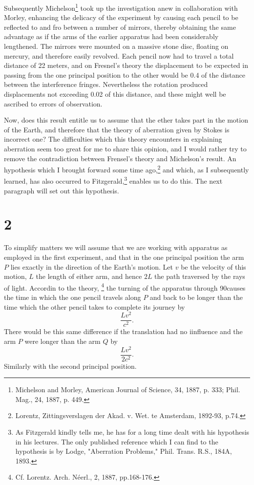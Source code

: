 Subsequently Michelson\footnote{Michelson and Morley, American Journal of Science, 34, 1887, p. 333; Phil. Mag., 24, 1887, p. 449.} took up the investigation anew in collaboration with Morley, enhancing the delicacy of the experiment by causing each pencil to be reflected to and fro between a number of mirrors, thereby obtaining the same advantage as if the arms of the earlier apparatus had been considerably lengthened. The mirrors were mounted on a massive stone disc, floating on mercury, and therefore easily revolved. Each pencil now had to travel a total distance of 22 meters, and on Fresnel's theory the displacement to be expected in passing from the one principal position to the other would be 0.4 of the distance between the interference fringes. Nevertheless the rotation produced displacements not exceeding 0.02 of this distance, and these might well be ascribed to errors of observation.

Now, does this result entitle us to assume that the ether takes part in the motion of the Earth, and therefore that the theory of aberration given by Stokes is incorrect one? The difficulties which this theory encounters in explaining aberration seem too great for me to share this opinion, and I would rather try to remove the contradiction between Frensel's theory and Michelson's result. An hypothesis which I brought forward some time ago,\footnote{Lorentz, Zittingsverslagen der Akad. v. Wet. te Amsterdam, 1892-93, p.74.} and which, as I subsequently learned, has also occurred to Fitzgerald,\footnote{As Fitzgerald kindly tells me, he has for a long time dealt with his hypothesis in his lectures. The only published reference which I can find to the hypothesis is by Lodge, "Aberration Problems," Phil. Trans. R.S., 184A, 1893.} enables us to do this. The next paragraph will set out this hypothesis.


\section*{2}
To simplify matters we will assume that we are working with apparatus as employed in the first experiment, and that in the one principal position the arm $P$ lies exactly in the direction of the Earth's motion. Let $v$ be the velocity of this motion, $L$ the length of either arm, and hence $2L$ the path traversed by the rays of light. Accordin to the theory, \footnote{Cf. Lorentz. Arch. Néerl., 2, 1887, pp.168-176.} the turning of the apparatus through 90\textdegree causes the time in which the one pencil travels along $P$ and back to be longer than the time which the other pencil takes to complete its journey by
$$\frac{Lv^2}{c^2}.$$
There would be this same difference if the translation had no iinfluence and the arm $P$ were longer than the arm $Q$ by $$\frac{Lv^2}{2c^2}.$$ Similarly with the second principal position.

